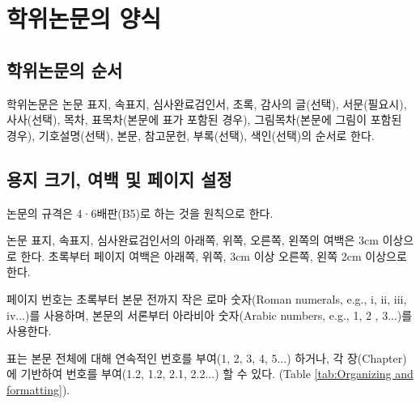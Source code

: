 \documentclass{report}
\begin{document}
\chapter{학위논문의 양식}\label{chap:organizing}

\section{학위논문의 순서}\label{sec:order}
학위논문은 논문 표지, 속표지, 심사완료검인서, 초록, 감사의 글(선택), 서문(필요시), 사사(선택), 목차, 표목차(본문에 표가 포함된 경우), 그림목차(본문에 그림이 포함된 경우), 기호설명(선택), 본문, 참고문헌, 부록(선택), 색인(선택)의 순서로 한다.

\section{용지 크기, 여백 및 페이지 설정} \label{sec:papersize}
논문의 규격은 4·6배판(B5)로 하는 것을 원칙으로 한다.

논문 표지, 속표지, 심사완료검인서의 아래쪽, 위쪽, 오른쪽, 왼쪽의 여백은 3cm 이상으로 한다. 초록부터 페이지 여백은 아래쪽, 위쪽, 3cm 이상 오른쪽, 왼쪽 2cm 이상으로 한다.

페이지 번호는 초록부터 본문 전까지 작은 로마 숫자(Roman numerals, e.g., i, ii, iii, iv...)를 사용하며, 본문의 서론부터 아라비아 숫자(Arabic numbers, e.g., 1, 2 , 3...)를 사용한다.

 표는 본문 전체에 대해 연속적인 번호를 부여(1, 2, 3, 4, 5...) 하거나, 각 장(Chapter)에 기반하여 번호를 부여(1.2, 1.2, 2.1, 2.2...) 할 수 있다. (Table \ref{tab:Organizing and formatting}).
\end{document}
